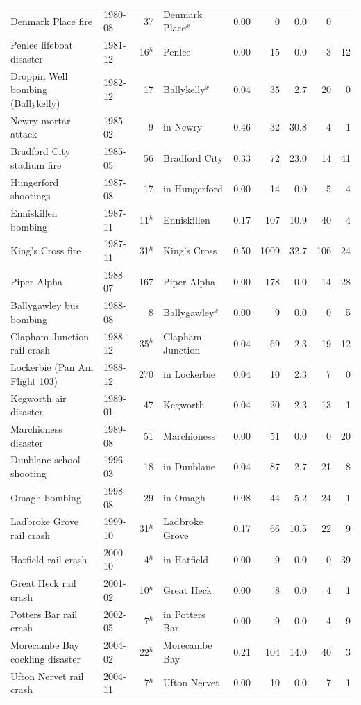 \documentclass[11pt,a4paper]{article}
\begin{document}
{\begin{longtable}{p{5.2cm}lrlrrrrr}
Denmark Place fire & 1980-08 & 37 & Denmark Place$^x$ & 0.00 & 0 & 0.0 & 0 & \\
Penlee lifeboat disaster & 1981-12 & 16$^h$ & Penlee & 0.00 & 15 & 0.0 & 3 & 12\\
Droppin Well bombing (Ballykelly) & 1982-12 & 17 & Ballykelly$^x$ & 0.04 & 35 & 2.7 & 20 & 0\\
Newry mortar attack & 1985-02 & 9 & in Newry & 0.46 & 32 & 30.8 & 4 & 1\\
Bradford City stadium fire & 1985-05 & 56 & Bradford City & 0.33 & 72 & 23.0 & 14 & 41\\
Hungerford shootings & 1987-08 & 17 & in Hungerford & 0.00 & 14 & 0.0 & 5 & 4\\
Enniskillen bombing & 1987-11 & 11$^h$ & Enniskillen & 0.17 & 107 & 10.9 & 40 & 4\\
King's Cross fire & 1987-11 & 31$^h$ & King's Cross & 0.50 & 1009 & 32.7 & 106 & 24\\
Piper Alpha & 1988-07 & 167 & Piper Alpha & 0.00 & 178 & 0.0 & 14 & 28\\
Ballygawley bus bombing & 1988-08 & 8 & Ballygawley$^x$ & 0.00 & 9 & 0.0 & 0 & 5\\
Clapham Junction rail crash & 1988-12 & 35$^h$ & Clapham Junction & 0.04 & 69 & 2.3 & 19 & 12\\
Lockerbie (Pan Am Flight 103) & 1988-12 & 270 & in Lockerbie & 0.04 & 10 & 2.3 & 7 & 0\\
Kegworth air disaster & 1989-01 & 47 & Kegworth & 0.04 & 20 & 2.3 & 13 & 1\\
Marchioness disaster & 1989-08 & 51 & Marchioness & 0.00 & 51 & 0.0 & 0 & 20\\
Dunblane school shooting & 1996-03 & 18 & in Dunblane & 0.04 & 87 & 2.7 & 21 & 8\\
Omagh bombing & 1998-08 & 29 & in Omagh & 0.08 & 44 & 5.2 & 24 & 1\\
Ladbroke Grove rail crash & 1999-10 & 31$^h$ & Ladbroke Grove & 0.17 & 66 & 10.5 & 22 & 9\\
Hatfield rail crash & 2000-10 & 4$^h$ & in Hatfield & 0.00 & 9 & 0.0 & 0 & 39\\
Great Heck rail crash & 2001-02 & 10$^h$ & Great Heck & 0.00 & 8 & 0.0 & 4 & 1\\
Potters Bar rail crash & 2002-05 & 7$^h$ & in Potters Bar & 0.00 & 9 & 0.0 & 4 & 9\\
Morecambe Bay cockling disaster & 2004-02 & 22$^h$ & Morecambe Bay & 0.21 & 104 & 14.0 & 40 & 3\\
Ufton Nervet rail crash & 2004-11 & 7$^h$ & Ufton Nervet & 0.00 & 10 & 0.0 & 7 & 1\\

\end{longtable}}
\end{document}

